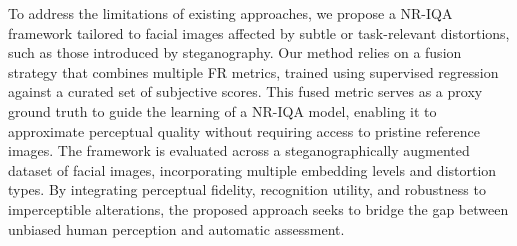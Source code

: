 To address the limitations of existing approaches, we propose a NR-IQA framework tailored to facial images affected by subtle or task-relevant distortions, such as those introduced by steganography. Our method relies on a fusion strategy that combines multiple FR metrics, trained using supervised regression against a curated set of subjective scores. This fused metric serves as a proxy ground truth to guide the learning of a NR-IQA model, enabling it to approximate perceptual quality without requiring access to pristine reference images. The framework is evaluated across a steganographically augmented dataset of facial images, incorporating multiple embedding levels and distortion types. By integrating perceptual fidelity, recognition utility, and robustness to imperceptible alterations, the proposed approach seeks to bridge the gap between unbiased human perception and automatic assessment.
